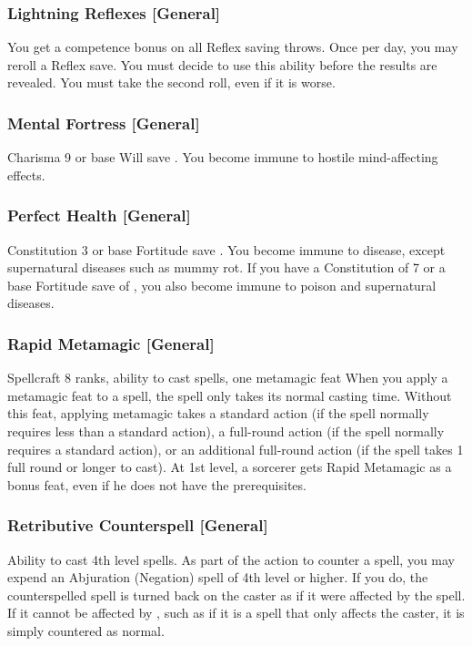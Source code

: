 \subsubsection{Lightning Reflexes [General]}
 You get a  competence bonus on all Reflex saving throws. Once per day, you may reroll a Reflex save. You must decide to use this ability before the results are revealed. You must take the second roll, even if it is worse.

\subsubsection{Mental Fortress [General]}
\featpre Charisma 9 or base Will save .
\featben You become immune to hostile mind-affecting effects.

\subsubsection{Perfect Health [General]}
\featpre Constitution 3 or base Fortitude save .
\featben You become immune to disease, except supernatural diseases such as mummy rot. If you have a Constitution of 7 or a base Fortitude save of , you also become immune to poison and supernatural diseases.

\subsubsection{Rapid Metamagic [General]}
 Spellcraft 8 ranks, ability to cast spells, one metamagic feat
 When you apply a metamagic feat to a spell, the spell only takes its normal casting time.
 Without this feat, applying metamagic takes a standard action (if the spell normally requires less than a standard action), a full-round action (if the spell normally requires a standard action), or an additional full-round action (if the spell takes 1 full round or longer to cast).
 At 1st level, a sorcerer gets Rapid Metamagic as a bonus feat, even if he does not have the prerequisites.

\subsubsection{Retributive Counterspell [General]}
 Ability to cast 4th level spells.
 As part of the action to counter a spell, you may expend an Abjuration (Negation) spell of 4th level or higher. If you do, the counterspelled spell is turned back on the caster as if it were affected by the  spell. If it cannot be affected by , such as if it is a spell that only affects the caster, it is simply countered as normal.

